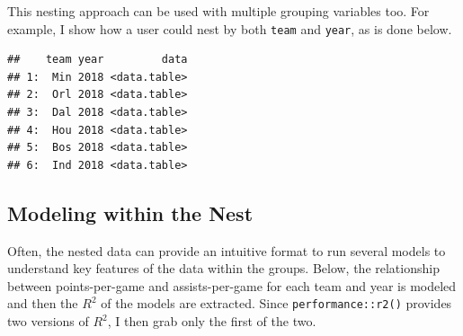 \documentclass[doc,floatsintext]{apa6}
\newenvironment{Shaded}{\begin{snugshade}}{\end{snugshade}}
\newcommand{\DataTypeTok}[1]{\textcolor[rgb]{0.13,0.29,0.53}{#1}}
\newcommand{\DecValTok}[1]{\textcolor[rgb]{0.00,0.00,0.81}{#1}}
\newcommand{\ErrorTok}[1]{\textcolor[rgb]{0.64,0.00,0.00}{\textbf{#1}}}
\newcommand{\KeywordTok}[1]{\textcolor[rgb]{0.13,0.29,0.53}{\textbf{#1}}}
\newcommand{\NormalTok}[1]{#1}
\newcommand{\OperatorTok}[1]{\textcolor[rgb]{0.81,0.36,0.00}{\textbf{#1}}}
\newcommand{\StringTok}[1]{\textcolor[rgb]{0.31,0.60,0.02}{#1}}
\begin{document}
This nesting approach can be used with multiple grouping variables too. For example, I show how a user could nest by both \texttt{team} and \texttt{year}, as is done below.

\begin{Shaded}
\end{Shaded}

\begin{verbatim}
##    team year         data
## 1:  Min 2018 <data.table>
## 2:  Orl 2018 <data.table>
## 3:  Dal 2018 <data.table>
## 4:  Hou 2018 <data.table>
## 5:  Bos 2018 <data.table>
## 6:  Ind 2018 <data.table>
\end{verbatim}

\hypertarget{modeling-within-the-nest}{%
\subsection{Modeling within the Nest}\label{modeling-within-the-nest}}

Often, the nested data can provide an intuitive format to run several models to understand key features of the data within the groups. Below, the relationship between points-per-game and assists-per-game for each team and year is modeled and then the \(R^2\) of the models are extracted. Since \texttt{performance::r2()} provides two versions of \(R^2\), I then grab only the first of the two.

\begin{Shaded}
\end{Shaded}
\end{document}

